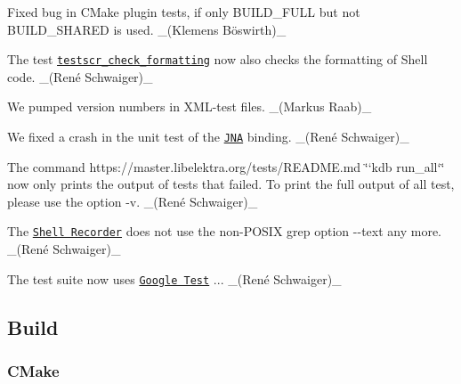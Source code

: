 \begin{DoxyItemize}
\item Fixed bug in C\+Make plugin tests, if only {\ttfamily B\+U\+I\+L\+D\+\_\+\+F\+U\+LL} but not {\ttfamily B\+U\+I\+L\+D\+\_\+\+S\+H\+A\+R\+ED} is used. \+\_\+(Klemens Böswirth)\+\_\+
\item The test \href{https://master.libelektra.org/tests/shell/check_formatting.sh}{\tt {\ttfamily testscr\+\_\+check\+\_\+formatting}} now also checks the formatting of Shell code. \+\_\+(René Schwaiger)\+\_\+
\item We pumped version numbers in X\+M\+L-\/test files. \+\_\+(\+Markus Raab)\+\_\+
\item We fixed a crash in the unit test of the \href{https://www.libelektra.org/bindings/jna}{\tt J\+NA} binding. \+\_\+(René Schwaiger)\+\_\+
\item The command https\+://master.libelektra.\+org/tests/\+R\+E\+A\+D\+ME.md \char`\"{}`kdb run\+\_\+all`\char`\"{} now only prints the output of tests that failed. To print the full output of all test, please use the option {\ttfamily -\/v}. \+\_\+(René Schwaiger)\+\_\+
\item The \href{https://master.libelektra.org/tests/shell/shell_recorder}{\tt Shell Recorder} does not use the non-\/\+P\+O\+S\+IX grep option {\ttfamily -\/-\/text} any more. \+\_\+(René Schwaiger)\+\_\+
\item The test suite now uses \href{https://github.com/google/googletest}{\tt Google Test} {..}. \+\_\+(René Schwaiger)\+\_\+
\end{DoxyItemize}

\subsection*{Build}

\subsubsection*{C\+Make}


